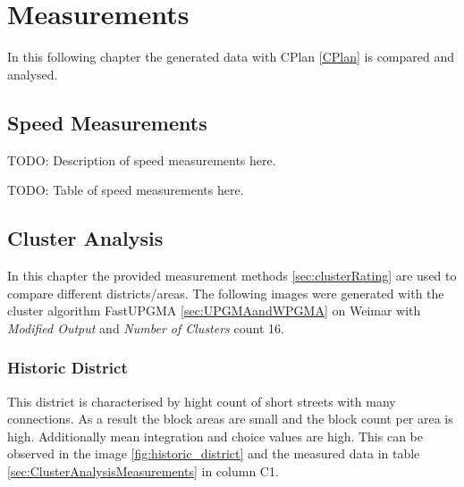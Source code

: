 \chapter{Measurements}
\label{sec:measurements}
In this following chapter the generated data with CPlan \ref{CPlan} is compared and analysed. 
\section{Speed Measurements}
\label{sec:measurements-speed}
TODO: Description of speed measurements here. 

TODO: Table of speed measurements here.

\section{Cluster Analysis}
\label{sec:measurements-cluster-analysis}
In this chapter the provided measurement methods \ref{sec:clusterRating} are used to compare different districts/areas. The following images were generated with the cluster algorithm FastUPGMA \ref{sec:UPGMAandWPGMA} on Weimar with \textit{Modified Output} and \textit{Number of Clusters} count 16.

\subsection{Historic District}
\label{sec:historyDistinct}
This district is characterised by hight count of short streets with many connections. As a result the block areas are small and the block count per area is high. Additionally mean integration and choice values are high. This can be observed in the image \ref{fig:historic_district} and the measured data in table \ref{sec:ClusterAnalysisMeasurements} in column C1.


